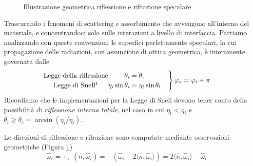\begin{figure}[tb]
\begin{scaletikzpicturetowidth}{\linewidth}
\end{scaletikzpicturetowidth}
\caption{Illustrazione geometrica riflessione e rifrazione speculare}
\label{chapter3:surface:specular}
\end{figure}
Trascurando i fenomeni di scattering e assorbimento che avvengono all'interno del materiale, e concentrandoci solo sulle interazioni a livello di
interfaccia. Partiamo analizzando con queste convenzioni le superfici perfettamente speculari, la cui propagazione delle radiazioni, con assunzione di 
ottica geometrica, \`e interamente governata dalle 
\begin{align}\label{chapter3:surface:snell}
	\renewcommand{\arraystretch}{1.2}%
	\setlength{\arraycolsep}{0pt}%
	\left.\begin{array}{ c r >{{}}l@{\quad} }
		\text{Legge della riflessione} & \theta_i &= \theta_r  \\
		\text{Legge di Snell\footnotemark{}} & \eta_i \sin\theta_i &= \eta_t\sin\theta_t \\
	\end{array}
	\right\}\varphi_o = \varphi_i + \pi
\end{align}
Ricordiamo che le implementazioni per la Legge di Snell devono tener conto della possibilit\`a di \textit{riflessione interna totale}, nel caso in
cui $\eta_t < \eta_i$ e \mbox{$\theta_i \geq \theta_c = \arcsin(\eta_i/\eta_t)$}.\par
Le direzioni di riflessione e rifrazione sono computate mediante osservazioni geometriche (Figura \ref{chapter3:surface:specular})
\begin{equation}
	\hat{\omega}_r =\uptau_r(\hat{n},\hat{\omega}_i)= %
		-(\hat{\omega}_i - 2\langle\hat{n},\hat{\omega}_i\rangle) = 2\langle\hat{n},\hat{\omega}_i\rangle - \hat{\omega}_i
\end{equation}

